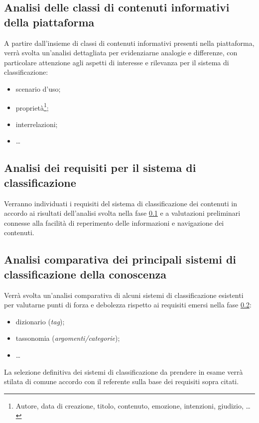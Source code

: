 \documentclass[10pt,a4paper,hidelinks]{scrartcl} %
\begin{document}
	\subsection{Analisi delle classi di contenuti informativi della piattaforma}
	\label{sec:stage:wp:analisi-contenuti}
	A partire dall'insieme di classi di contenuti informativi presenti nella piattaforma, verrà svolta un'analisi dettagliata per evidenziarne analogie e differenze, con particolare attenzione agli aspetti di interesse e rilevanza per il sistema di classificazione:
	\begin{itemize}
		\item scenario d'uso;
		\item proprietà\footnote{Autore, data di creazione, titolo, contenuto, emozione, intenzioni, giudizio, \ldots};
		\item interrelazioni;
		\item \ldots
	\end{itemize}

	\subsection{Analisi dei requisiti per il sistema di classificazione}
	\label{sec:stage:wp:ar}
	Verranno individuati i requisiti del sistema di classificazione dei contenuti in accordo ai risultati dell'analisi svolta nella fase \ref{sec:stage:wp:analisi-contenuti} e a valutazioni preliminari connesse alla facilità di reperimento delle informazioni e navigazione dei contenuti.

	\subsection{Analisi comparativa dei principali sistemi di classificazione della conoscenza}
	\label{sec:stage:wp:ac}
	Verrà svolta un'analisi comparativa di alcuni sistemi di classificazione esistenti per valutarne punti di forza e debolezza rispetto ai requisiti emersi nella fase \ref{sec:stage:wp:ar}:
	\begin{itemize}
		\item dizionario (\emph{tag});
		\item tassonomia (\emph{argomenti/categorie});
		\item \ldots
	\end{itemize}
	La selezione definitiva dei sistemi di classificazione da prendere in esame verrà stilata di comune accordo con il referente sulla base dei requisiti sopra citati.
\end{document}
